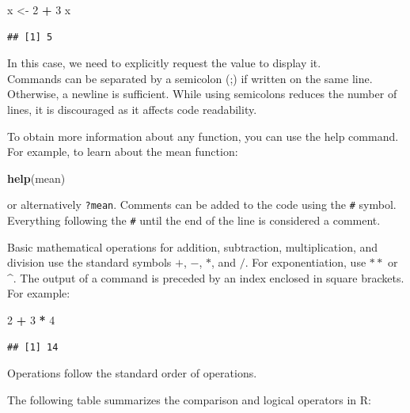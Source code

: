 \documentclass[
]{article}
\newenvironment{Shaded}{\begin{snugshade}}{\end{snugshade}}
\newcommand{\DecValTok}[1]{\textcolor[rgb]{0.00,0.00,0.81}{#1}}
\newcommand{\FunctionTok}[1]{\textcolor[rgb]{0.13,0.29,0.53}{\textbf{#1}}}
\newcommand{\NormalTok}[1]{#1}
\newcommand{\OtherTok}[1]{\textcolor[rgb]{0.56,0.35,0.01}{#1}}
\newcommand{\SpecialCharTok}[1]{\textcolor[rgb]{0.81,0.36,0.00}{\textbf{#1}}}
\begin{document}
\begin{Shaded}
\begin{Highlighting}[]
\NormalTok{x }\OtherTok{\textless{}{-}} \DecValTok{2} \SpecialCharTok{+} \DecValTok{3}
\NormalTok{x}
\end{Highlighting}
\end{Shaded}

\begin{verbatim}
## [1] 5
\end{verbatim}

In this case, we need to explicitly request the value to display it.\\
Commands can be separated by a semicolon (;) if written on the same
line. Otherwise, a newline is sufficient. While using semicolons reduces
the number of lines, it is discouraged as it affects code readability.

To obtain more information about any function, you can use the help
command. For example, to learn about the mean function:

\begin{Shaded}
\begin{Highlighting}[]
\FunctionTok{help}\NormalTok{(mean)}
\end{Highlighting}
\end{Shaded}

or alternatively \texttt{?mean}. Comments can be added to the code using
the \texttt{\#} symbol. Everything following the \texttt{\#} until the
end of the line is considered a comment.

Basic mathematical operations for addition, subtraction, multiplication,
and division use the standard symbols \(+\), \(-\), \(*\), and \(/\).
For exponentiation, use \(**\) or \^{}. The output of a command is
preceded by an index enclosed in square brackets. For example:

\begin{Shaded}
\begin{Highlighting}[]
\DecValTok{2} \SpecialCharTok{+} \DecValTok{3} \SpecialCharTok{*} \DecValTok{4}
\end{Highlighting}
\end{Shaded}

\begin{verbatim}
## [1] 14
\end{verbatim}

Operations follow the standard order of operations.

The following table summarizes the comparison and logical operators in
R:
\end{document}
